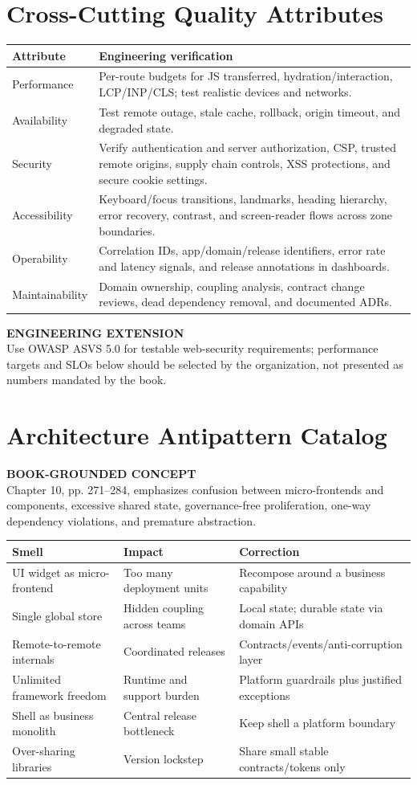 \documentclass[11pt,letterpaper,oneside]{report}
\newcommand{\based}[1]{\begin{sourcebox}\textbf{BOOK-GROUNDED CONCEPT}\\#1\end{sourcebox}}
\newcommand{\added}[1]{\begin{engineerbox}\textbf{ENGINEERING EXTENSION}\\#1\end{engineerbox}}
\begin{document}
\chapter{Cross-Cutting Quality Attributes}
\begin{longtable}{>{\raggedright\arraybackslash}p{.25\linewidth}>{\raggedright\arraybackslash}p{.67\linewidth}}\toprule Attribute & Engineering verification \\\midrule
Performance & Per-route budgets for JS transferred, hydration/interaction, LCP/INP/CLS; test realistic devices and networks.\\
Availability & Test remote outage, stale cache, rollback, origin timeout, and degraded state.\\
Security & Verify authentication and server authorization, CSP, trusted remote origins, supply chain controls, XSS protections, and secure cookie settings.\\
Accessibility & Keyboard/focus transitions, landmarks, heading hierarchy, error recovery, contrast, and screen-reader flows across zone boundaries.\\
Operability & Correlation IDs, app/domain/release identifiers, error rate and latency signals, and release annotations in dashboards.\\
Maintainability & Domain ownership, coupling analysis, contract change reviews, dead dependency removal, and documented ADRs.\\\bottomrule\end{longtable}
\added{Use OWASP ASVS 5.0 for testable web-security requirements; performance targets and SLOs below should be selected by the organization, not presented as numbers mandated by the book.}
\chapter{Architecture Antipattern Catalog}
\based{Chapter 10, pp. 271--284, emphasizes confusion between micro-frontends and components, excessive shared state, governance-free proliferation, one-way dependency violations, and premature abstraction.}
\begin{longtable}{>{\raggedright\arraybackslash}p{.25\linewidth}>{\raggedright\arraybackslash}p{.29\linewidth}>{\raggedright\arraybackslash}p{.35\linewidth}}\toprule Smell & Impact & Correction \\\midrule
UI widget as micro-frontend & Too many deployment units & Recompose around a business capability\\
Single global store & Hidden coupling across teams & Local state; durable state via domain APIs\\
Remote-to-remote internals & Coordinated releases & Contracts/events/anti-corruption layer\\
Unlimited framework freedom & Runtime and support burden & Platform guardrails plus justified exceptions\\
Shell as business monolith & Central release bottleneck & Keep shell a platform boundary\\
Over-sharing libraries & Version lockstep & Share small stable contracts/tokens only\\\bottomrule\end{longtable}
\end{document}
